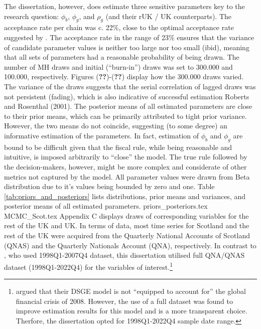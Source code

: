 The dissertation, however, does estimate three sensitive parameters key to the research question: $\phi_b$, $\phi_g$, and $\rho_g$ (and their rUK / UK counterparts). The acceptance rate per chain was c. 22\%, close to the optimal acceptance rate suggested by \textcite{roberts_2001_optimal}. The acceptance rate in the range of 23\% ensures that the variance of candidate parameter values is neither too large nor too small (ibid), meaning that all sets of parameters had a reasonable probability of being drawn. The number of MH draws and initial (``burn-in'') draws was set to 300.000 and 100.000, respectively. Figures (\textbf{??})-(\textbf{??}) display how the 300.000 draws varied. The variance of the draws suggests that the serial correlation of lagged draws was not persistent (fading), which is also indicative of successful estimation Roberts and Rosenthal (2001). The posterior means of all estimated parameters are close to their prior means, which can be primarily attributed to tight prior variance. However, the two means do not coincide, suggesting (to some degree) an informative estimation of the parameters. In fact, estimation of $\phi_b$ and $\phi_g$ are bound to be difficult given that the fiscal rule, while being reasonable and intuitive, is imposed arbitrarily to ``close'' the model. The true rule followed by the decision-makers, however, might be more complex and considerate of other metrics not captured by the model. All parameter values were drawn from Beta distribution due to it's values being bounded by zero and one. Table \ref{tab:priors_and_posteriors} lists distributions, prior means and variances, and posterior means of all estimated parameters. 
{priors_posteriors.tex}
{MCMC_Scot.tex}
Appendix C displays draws of corresponding variables for the rest of the UK and UK. In terms of data, most time series for Scotland and the rest of the UK were acquired from the Quarterly National Accounts of Scotland (QNAS) and the Quarterly Nationals Account (QNA), respectively. In contrast to \textcite{ricci_2019_essays}, who used 1998Q1-2007Q4 dataset, this dissertation utilised full QNA/QNAS dataset (1998Q1-2022Q4) for the variables of interest.\enlargethispage{\baselineskip}\footnote{\textcite{ricci_2019_essays} argued that their DSGE model is not ``equipped to account for''\parencite[123]{ricci_2019_essays} the global financial crisis of 2008. However, the use of a full dataset was found to improve estimation results for this model and is a more transparent choice. Therfore, the dissertation opted for 1998Q1-2022Q4 sample date range.\nopagebreak}
